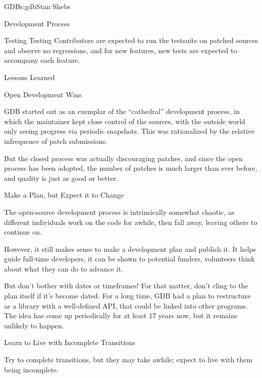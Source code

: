 \begin{aosachapter}{GDB}{s:gdb}{Stan Shebs}
\begin{aosasect1}{Development Process}
\begin{aosasect2}{Testing Testing}
Contributors are expected to run the testsuite on patched sources
and observe no regressions, and for new features, new tests are
expected to accompany each feature.

\end{aosasect2}

\end{aosasect1}

\begin{aosasect1}{Lessons Learned}

\begin{aosasect2}{Open Development Wins}

GDB started out as an exemplar of the ``cathedral'' development
process, in which the maintainer kept close control of the sources,
with the outside world only seeing progress via periodic snapshots.
This was rationalized by the relative infrequence of patch submissions.

But the closed process was actually discouraging patches, and since
the open process has been adopted, the number of patches is much
larger than ever before, and quality is just as good or better.

\end{aosasect2}

\begin{aosasect2}{Make a Plan, but Expect it to Change}

The open-source development process is intrinsically somewhat chaotic,
as different individuals work on the code for awhile, then fall away,
leaving others to continue on.

However, it still makes sense to make a development plan and publish it.
It helps guide full-time developers, it can be shown to potential funders,
volunteers think about what they can do to advance it.

But don't bother with dates or timeframes!  For that matter, don't
cling to the plan itself if it's become dated.  For a long time, GDB
had a plan to restructure as a library  with a
well-defined API, that could be linked into other programs.  The idea
has come up periodically for at least 17 years now, but it remains
unlikely to happen.

\end{aosasect2}

\begin{aosasect2}{Learn to Live with Incomplete Transitions}

Try to complete transitions, but they may take awhile; expect to live
with them being incomplete.


\end{aosasect2}
\end{aosasect1}
\end{aosachapter}
